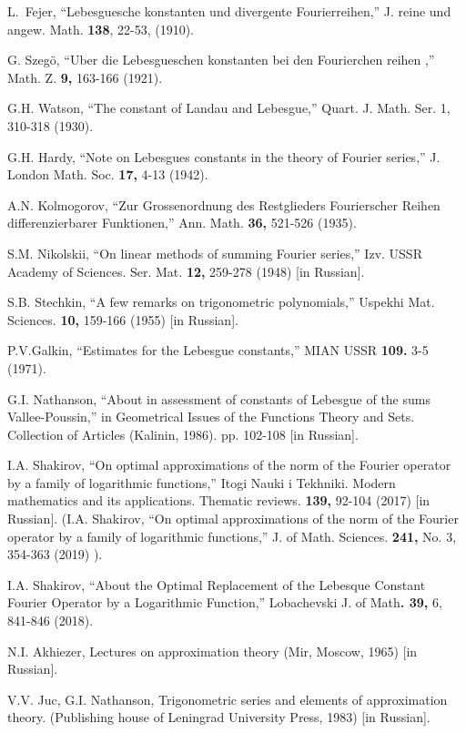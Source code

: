 \documentclass[
11pt,%
tightenlines,%
twoside,%
onecolumn,%
nofloats,%
nobibnotes,%
nofootinbib,%
superscriptaddress,%
noshowpacs,%
centertags]%
{revtex4}
\begin{document}
\begin{thebibliography}{20}

 L.~Fejer, ``Lebesguesche konstanten und divergente Fourierreihen,''  J. reine und angew. Math.  \textbf{138}, 22-53, (1910).

 G. Szeg\"o, ``Uber die Lebesgueschen konstanten bei den Fourierchen reihen ,'' Math. Z. \textbf{9,} 163-166 (1921).

 G.H. Watson, ``The constant of Landau and Lebesgue,'' Quart. J. Math. Ser. 1, 310-318 (1930).

 G.H. Hardy, ``Note on Lebesgues constants in the theory of Fourier series,'' J. London Math. Soc. \textbf{17,} 4-13 (1942).

 A.N. Kolmogorov, ``Zur Grossenordnung des Restglieders Fourierscher Reihen differenzierbarer Funktionen,'' Ann. Math. \textbf{36,} 521-526 (1935).

 S.M. Nikolskii, ``On linear methods of summing Fourier series,'' Izv. USSR Academy of Sciences. Ser. Mat. \textbf{12,} 259-278 (1948) [in Russian].

 S.B. Stechkin, ``A few remarks on trigonometric polynomials,'' Uspekhi Mat. Sciences. \textbf{10,} 159-166 (1955) [in Russian].

 P.V.Galkin, ``Estimates for the Lebesgue constants,'' MIAN USSR \textbf{109. }3-5 (1971).

 G.I. Nathanson, ``About in assessment of constants of Lebesgue of the sums Vallee-Poussin,'' in Geometrical Issues of the Functions Theory and Sets. Collection of Articles (Kalinin, 1986).  pp. 102-108 [in Russian].

 I.A. Shakirov, ``On optimal approximations of the norm of the Fourier operator by a family of logarithmic functions,'' Itogi Nauki i Tekhniki. Modern mathematics and its applications. Thematic reviews. \textbf{139,} 92-104 (2017) [in Russian]. (I.A. Shakirov, ``On optimal approximations of the norm of the Fourier operator by a family of logarithmic functions,'' J. of Math. Sciences. \textbf{241,} No. 3, 354-363 (2019) ).

 I.A. Shakirov,  ``About the Optimal Replacement of the Lebesque Constant Fourier Operator by a Logarithmic Function,'' Lobachevski J. of Math\textbf{. 39,} 6, 841-846 (2018).

 N.I. Akhiezer, Lectures on approximation theory (Mir, Moscow, 1965) [in Russian].

 V.V. Juc, G.I. Nathanson, Trigonometric series and elements of approximation theory. (Publishing house of Leningrad University Press, 1983) [in Russian].

\end{thebibliography}
\end{document}
